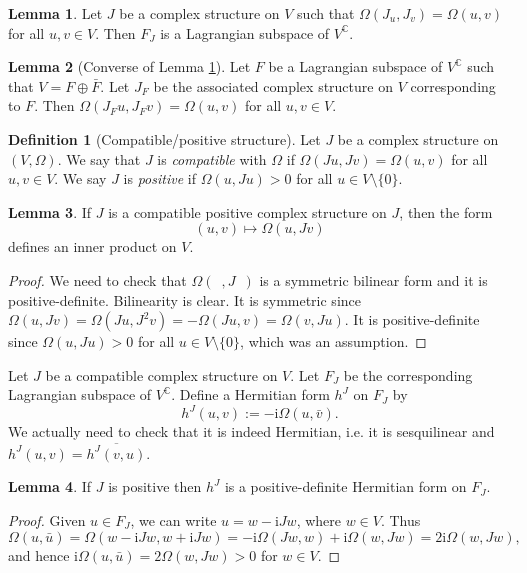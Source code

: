\documentclass[11pt]{amsart}
\numberwithin{equation}{section}
\theoremstyle{plain}
\theoremstyle{definition}
\newtheorem{defn}{Definition}[subsection]
\newtheorem{lem}{Lemma}[subsection]
\theoremstyle{remark}
\newcommand{\I}{\mathrm{i}}
\begin{document}
\begin{lem}
\label{lem1}
Let $J$ be a complex structure on $V$ such that $\Omega(J_u,J_v)=\Omega(u,v)$ for all $u,v\in V$. Then $F_J$ is a Lagrangian subspace of $V^\mathbb{C}$.
\end{lem}

\begin{lem}[Converse of Lemma \ref{lem1}]
Let $F$ be a Lagrangian subspace of $V^\mathbb{C}$ such that $V=F\oplus \bar F$. Let $J_F$ be the associated complex structure on $V$ corresponding to $F$. Then $\Omega(J_Fu,J_Fv)=\Omega(u,v)$ for all $u,v\in V$.
\end{lem}


\begin{defn}[Compatible/positive structure]
Let $J$ be a complex structure on $(V,\Omega)$. We say that $J$ is \emph{compatible} with $\Omega$ if $\Omega(Ju,Jv)=\Omega(u,v)$ for all $u,v\in V$. We say $J$ is \emph{positive} if $\Omega(u,Ju)>0$ for all $u\in V\setminus\{0\}$.
\end{defn}

\begin{lem}
If $J$ is a compatible positive complex structure on $J$, then the form 
$$(u,v)\mapsto \Omega(u,Jv)$$
defines an inner product on $V$.
\end{lem}

\begin{proof}
We need to check that $\Omega(\enspace,J\enspace)$ is a symmetric bilinear form and it is positive-definite. Bilinearity is clear. It is symmetric since $\Omega(u,Jv)=\Omega(Ju,J^2v)=-\Omega(Ju,v)=\Omega(v,Ju)$. It is positive-definite since $\Omega(u,Ju)>0$ for all $u\in V\setminus\{0\}$, which was an assumption. 
\end{proof}
Let $J$ be a compatible complex structure on $V$. Let $F_J$ be the corresponding Lagrangian subspace of $V^\mathbb{C}$. Define a Hermitian form $h^J$ on $F_J$ by 
$$h^J(u,v):=-\I\Omega(u,\bar v).$$
We actually need to check that it is indeed Hermitian, i.e. it is sesquilinear and $h^J(u,v)=\overline{h^J(v,u)}$.

\begin{lem}
If $J$ is positive then $h^J$ is a positive-definite Hermitian form on $F_J$. 
\end{lem}

\begin{proof}
Given $u\in F_J$, we can write $u=w-\I Jw$, where $w\in V$. Thus
$$\Omega(u,\bar u)=\Omega(w-\I Jw,w+\I Jw)=-\I\Omega(Jw,w)+\I\Omega(w,Jw)=2\I\Omega(w,Jw),$$
and hence $\I\Omega(u,\bar u)=2\Omega(w,Jw)>0$ for $w\in V$.
\end{proof}
\end{document}
